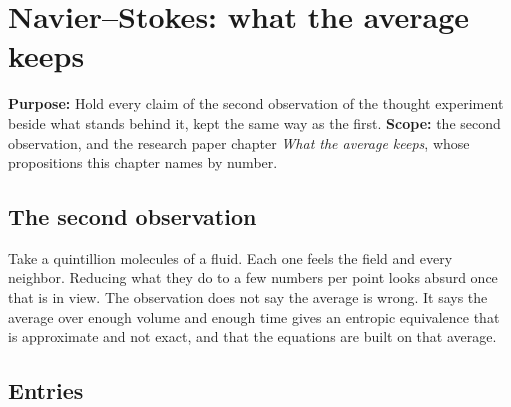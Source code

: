 \chapter{Navier--Stokes: what the average keeps}

\textbf{Purpose:} Hold every claim of the second observation of the thought experiment beside what
stands behind it, kept the same way as the first. \textbf{Scope:} the second observation, and the
research paper chapter \emph{What the average keeps}, whose propositions this chapter names by
number.

\section{The second observation}

Take a quintillion molecules of a fluid. Each one feels the field and every neighbor. Reducing
what they do to a few numbers per point looks absurd once that is in view. The observation does not
say the average is wrong. It says the average over enough volume and enough time gives an entropic
equivalence that is approximate and not exact, and that the equations are built on that average.

\section{Entries}

